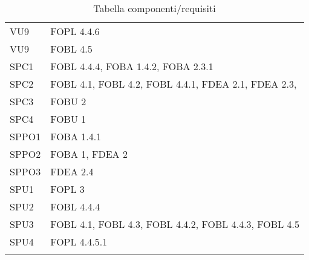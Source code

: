 \begin{longtable}{XX}
VU9&FOPL 4.4.6\\ 
VU9&FOBL 4.5\\ 
\midrule 
SPC1 & FOBL 4.4.4, FOBA 1.4.2, FOBA 2.3.1\\
\midrule
SPC2 & FOBL 4.1, FOBL 4.2, FOBL 4.4.1, FDEA 2.1, FDEA 2.3,  \\
\midrule
SPC3 & FOBU 2\\
\midrule
SPC4 & FOBU 1 \\
\midrule
SPPO1 & FOBA 1.4.1\\
\midrule
SPPO2 & FOBA 1, FDEA 2 \\
\midrule
SPPO3 & FDEA 2.4\\
\midrule
SPU1 & FOPL 3\\
\midrule
SPU2 & FOBL 4.4.4\\
\midrule
SPU3 & FOBL 4.1, FOBL 4.3, FOBL 4.4.2, FOBL 4.4.3, FOBL 4.5\\
\midrule
SPU4 & FOPL 4.4.5.1\\
\midrule

\bottomrule
\caption{Tabella componenti/requisiti}
\end{longtable} 
